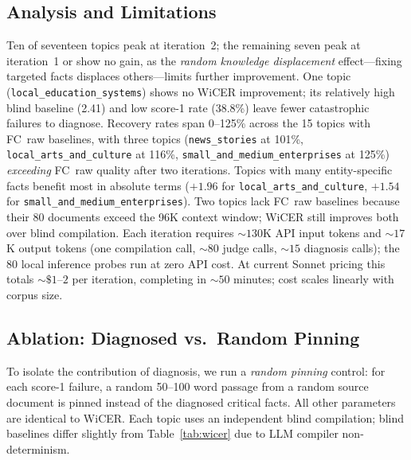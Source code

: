 \documentclass{article}
\begin{document}
\subsection{Analysis and Limitations}

Ten of seventeen topics peak at iteration~2; the remaining seven peak at iteration~1 or show no gain, as the \emph{random knowledge displacement} effect---fixing targeted facts displaces others---limits further improvement. One topic (\texttt{local\_education\_systems}) shows no WiCER improvement; its relatively high blind baseline (2.41) and low score-1 rate (38.8\%) leave fewer catastrophic failures to diagnose. Recovery rates span 0--125\% across the 15 topics with FC~raw baselines, with three topics (\texttt{news\_stories} at 101\%, \texttt{local\_arts\_and\_culture} at 116\%, \texttt{small\_and\_medium\_enterprises} at 125\%) \emph{exceeding} FC~raw quality after two iterations. Topics with many entity-specific facts benefit most in absolute terms ($+1.96$ for \texttt{local\_arts\_and\_culture}, $+1.54$ for \texttt{small\_and\_medium\_enterprises}). Two topics lack FC~raw baselines because their 80 documents exceed the 96K context window; WiCER still improves both over blind compilation. Each iteration requires ${\sim}130$K API input tokens and ${\sim}17$K output tokens (one compilation call, ${\sim}80$ judge calls, ${\sim}15$ diagnosis calls); the 80 local inference probes run at zero API cost. At current Sonnet pricing this totals ${\sim}\$1$--$2$ per iteration, completing in ${\sim}50$ minutes; cost scales linearly with corpus size.

\subsection{Ablation: Diagnosed vs.\ Random Pinning}
\label{sec:ablation}

To isolate the contribution of diagnosis, we run a \emph{random pinning}
control: for each score-1 failure, a random 50--100 word passage from a
random source document is pinned instead of the diagnosed critical facts.
All other parameters are identical to WiCER. Each topic uses an
independent blind compilation; blind baselines differ slightly from
Table~\ref{tab:wicer} due to LLM compiler non-determinism.
\end{document}
